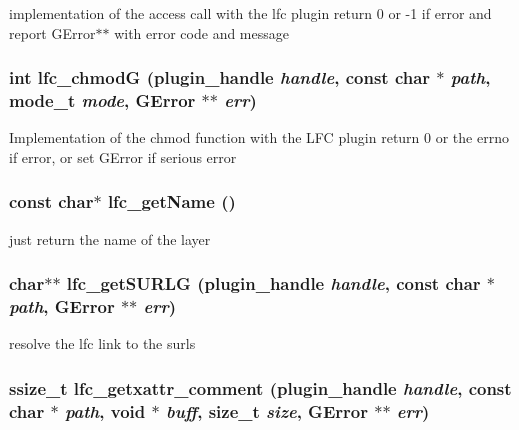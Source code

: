 implementation of the access call with the lfc plugin return 0 or -1 if error and report GError$\ast$$\ast$ with error code and message 
\subsubsection{\setlength{\rightskip}{0pt plus 5cm}int lfc\_\-chmod\-G (plugin\_\-handle {\em handle}, const char $\ast$ {\em path}, mode\_\-t {\em mode}, GError $\ast$$\ast$ {\em err})}\label{gfal__common__lfc_8c_e18ac164a5882443e74ba8f622186e42}


Implementation of the chmod function with the LFC plugin return 0 or the errno if error, or set GError if serious error 
\subsubsection{\setlength{\rightskip}{0pt plus 5cm}const char$\ast$ lfc\_\-get\-Name ()}\label{gfal__common__lfc_8c_67715cf749ea720de31abbc67f9f414e}


just return the name of the layer 
\subsubsection{\setlength{\rightskip}{0pt plus 5cm}char$\ast$$\ast$ lfc\_\-get\-SURLG (plugin\_\-handle {\em handle}, const char $\ast$ {\em path}, GError $\ast$$\ast$ {\em err})}\label{gfal__common__lfc_8c_ab2b9f80b14228974befa9d005ea7bc9}


resolve the lfc link to the surls 
\subsubsection{\setlength{\rightskip}{0pt plus 5cm}ssize\_\-t lfc\_\-getxattr\_\-comment (plugin\_\-handle {\em handle}, const char $\ast$ {\em path}, void $\ast$ {\em buff}, size\_\-t {\em size}, GError $\ast$$\ast$ {\em err})}\label{gfal__common__lfc_8c_78bd16529e609c94b3715efe38e901a5}


